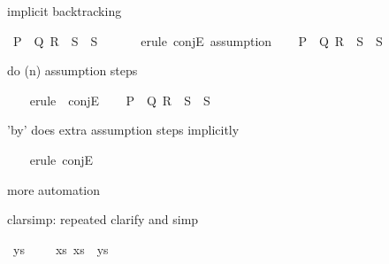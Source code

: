 \begin{isabellebody}
\begin{isamarkuptext}
\end{isamarkuptext}\isamarkuptrue%
%
\begin{isamarkuptext}%
implicit backtracking%
\end{isamarkuptext}\isamarkuptrue%
\isamarkupfalse%
\ {\isachardoublequoteopen}{\isasymlbrakk}P\ {\isasymand}\ Q{\isacharsemicolon}{\kern0pt}\ R\ {\isasymand}\ S{\isasymrbrakk}\ {\isasymLongrightarrow}\ S{\isachardoublequoteclose}\isanewline
\ \ \isanewline
%
\isadelimproof
\ \ %
\endisadelimproof
%
\isatagproof
{}\isamarkupfalse%
\ {\isacharparenleft}{\kern0pt}erule\ conjE{\isacharcomma}{\kern0pt}\ assumption{\isacharparenright}{\kern0pt}\isanewline
\ \ \isamarkupfalse%
%
\endisatagproof
{\isafoldproof}%
%
\isadelimproof
\isanewline
%
\endisadelimproof
\isanewline
{}\isamarkupfalse%
\ {\isachardoublequoteopen}{\isasymlbrakk}P\ {\isasymand}\ Q{\isacharsemicolon}{\kern0pt}\ R\ {\isasymand}\ S{\isasymrbrakk}\ {\isasymLongrightarrow}\ S{\isachardoublequoteclose}%
\begin{isamarkuptext}%
do (n) assumption steps%
\end{isamarkuptext}\isamarkuptrue%
%
\isadelimproof
\ \ %
\endisadelimproof
%
\isatagproof
{}\isamarkupfalse%
\ {\isacharparenleft}{\kern0pt}erule\ {\isacharparenleft}{\kern0pt}{}{\isacharparenright}{\kern0pt}\ conjE{\isacharparenright}{\kern0pt}\isanewline
\ \ \isamarkupfalse%
%
\endisatagproof
{\isafoldproof}%
%
\isadelimproof
%
\endisadelimproof
\isanewline
\isanewline
{}\isamarkupfalse%
\ {\isachardoublequoteopen}{\isasymlbrakk}P\ {\isasymand}\ Q{\isacharsemicolon}{\kern0pt}\ R\ {\isasymand}\ S{\isasymrbrakk}\ {\isasymLongrightarrow}\ S{\isachardoublequoteclose}%
\begin{isamarkuptext}%
'by' does extra assumption steps implicitly%
\end{isamarkuptext}\isamarkuptrue%
%
\isadelimproof
\ \ %
\endisadelimproof
%
\isatagproof
{}\isamarkupfalse%
\ {\isacharparenleft}{\kern0pt}erule\ conjE{\isacharparenright}{\kern0pt}%
\endisatagproof
{\isafoldproof}%
%
\isadelimproof
%
\endisadelimproof
%
\begin{isamarkuptext}%
more automation%
\end{isamarkuptext}\isamarkuptrue%
%
\begin{isamarkuptext}%
clarsimp: repeated clarify and simp%
\end{isamarkuptext}\isamarkuptrue%
\isamarkupfalse%
\ {\isachardoublequoteopen}ys\ {\isacharequal}{\kern0pt}\ {\isacharbrackleft}{\kern0pt}{\isacharbrackright}{\kern0pt}\ \ {\isasymLongrightarrow}\ {\isasymforall}xs{\isachardot}{\kern0pt}\ xs\ {\isacharat}{\kern0pt}\ ys\ {\isacharequal}{\kern0pt}\ {\isacharbrackleft}{\kern0pt}{\isacharbrackright}{\kern0pt}{\isachardoublequoteclose}\isanewline

\end{isabellebody}
